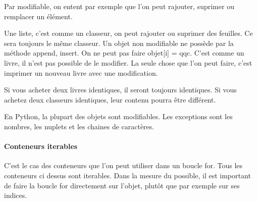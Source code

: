 \documentclass[letterpaper,10pt,english]{sphinxhowto}
\begin{document}
\sphinxAtStartPar
Par modifiable, on entent par exemple que l’on peut rajouter, suprimer ou remplacer un élément.

\begin{sphinxVerbatim}[commandchars=\\\{\}]
  \PYG{p}{[}\PYG{p}{]}
 
 \PYG{p}{[}\PYG{p}{]}
\PYG{p}{[}\PYG{p}{]}  
\end{sphinxVerbatim}

\begin{sphinxVerbatim}
\end{sphinxVerbatim}

\sphinxAtStartPar
Une liste, c’est comme un classeur, on peut rajouter ou suprimer des feuilles. Ce sera toujours le même classeur. Un objet non modifiable ne possède par la méthode append, insert. On ne peut pas faire objet{[}i{]} = qqc. C’est comme un livre, il n’est pas possible de le modifier. La seule chose que l’on peut faire, c’est imprimer un nouveau livre avec une modification.

\sphinxAtStartPar
Si vous acheter deux livres identiques, il seront toujours identiques. Si vous achetez deux classeurs identiques, leur contenu pourra être différent.

\sphinxAtStartPar
En Python, la plupart des objets sont modifiables. Les exceptions sont les nombres, les n\sphinxhyphen{}uplets et les chaines de caractères.


\paragraph{Conteneurs iterables}
\label{\detokenize{cours3_conteneur_cours:conteneurs-iterables}}
\sphinxAtStartPar
C’est le cas des conteneurs que l’on peut utiliser dans un boucle for. Tous les conteneurs ci dessus sont iterables.
Dans la mesure du possible, il est important de faire la boucle for directement sur l’objet, plutôt que par exemple sur ses indices.
\end{document}
